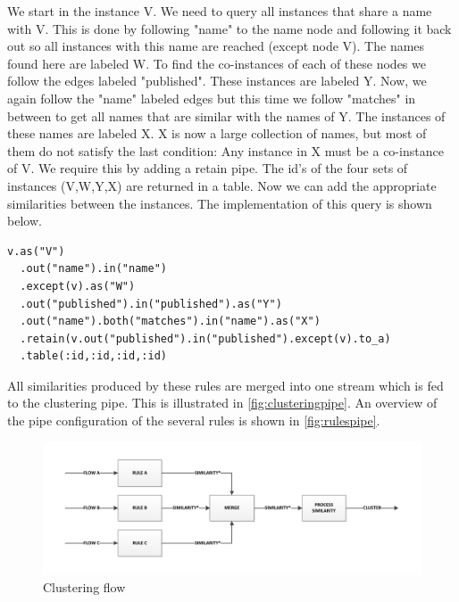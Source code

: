 We start in the instance V. We need to query all instances that share a name with V. This is done by following "name" to the name node and following it back out so all instances with this name are reached (except node V). The names found here are labeled W. To find the co-instances of each of these nodes we follow the edges labeled "published". These instances are labeled Y. Now, we again follow the "name" labeled edges but this time we follow "matches" in between to get all names that are similar with the names of Y. The instances of these names are labeled X. X is now a large collection of names, but most of them do not satisfy the last condition: Any instance in X must be a co-instance of V. We require this by adding a retain pipe. The id's of the four sets of instances (V,W,Y,X) are returned in a table. Now we can add the appropriate similarities between the instances. The implementation of this query is shown below.

\begin{verbatim}
v.as("V")
  .out("name").in("name")
  .except(v).as("W")
  .out("published").in("published").as("Y")
  .out("name").both("matches").in("name").as("X")
  .retain(v.out("published").in("published").except(v).to_a)
  .table(:id,:id,:id,:id)
\end{verbatim}

All similarities produced by these rules are merged into one stream which is fed to the clustering pipe. This is illustrated in \autoref{fig:clusteringpipe}. An overview of the pipe configuration of the several rules is shown in \autoref{fig:rulespipe}.

\begin{figure}[htb]
	\centering
		\includegraphics[width=1\textwidth]{fig/clusteringpipe}
	\caption{Clustering flow}
	\label{fig:clusteringpipe}
\end{figure}

